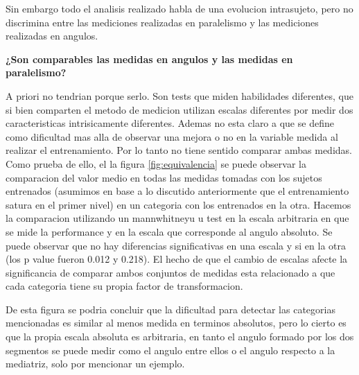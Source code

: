 \documentclass{article}
\begin{document}
\begin {table}
\begin{center}

\end{center}

\end{table}

Sin embargo todo el analisis realizado habla de una evolucion intrasujeto, pero no discrimina entre las mediciones realizadas en paralelismo y las mediciones realizadas en angulos.

\textbf{¿Son comparables las medidas en angulos y las medidas en paralelismo?}

A priori no tendrian porque serlo. Son tests que miden habilidades diferentes, que si bien comparten el metodo de medicion utilizan escalas diferentes por medir dos caracteristicas intrisicamente diferentes. Ademas no esta claro a que se define como dificultad mas alla de observar una mejora o no en la variable medida al realizar el entrenamiento. Por lo tanto no tiene sentido comparar ambas medidas. Como prueba de ello, el la figura \ref{fig:equivalencia} se puede observar la comparacion del valor medio en todas las medidas tomadas con los sujetos entrenados (asumimos en base a lo discutido anteriormente que el entrenamiento satura en el primer nivel) en un categoria con los entrenados en la otra. Hacemos la comparacion utilizando un mannwhitneyu u test en la escala arbitraria en que se mide la performance y en la escala que corresponde al angulo absoluto. Se puede observar que no hay diferencias significativas en una escala y si en la otra (los p value fueron 0.012 y 0.218). El hecho de que el cambio de escalas afecte la significancia de comparar ambos conjuntos de medidas esta relacionado a que cada categoria tiene su propia factor de transformacion. 

De esta figura se podria concluir que la dificultad para detectar las categorias mencionadas es similar al menos medida en terminos absolutos, pero lo cierto es que la propia escala absoluta es arbitraria, en tanto el angulo formado por los dos segmentos se puede medir como el angulo entre ellos o el angulo respecto a la mediatriz, solo por mencionar un ejemplo.
\end{document}
